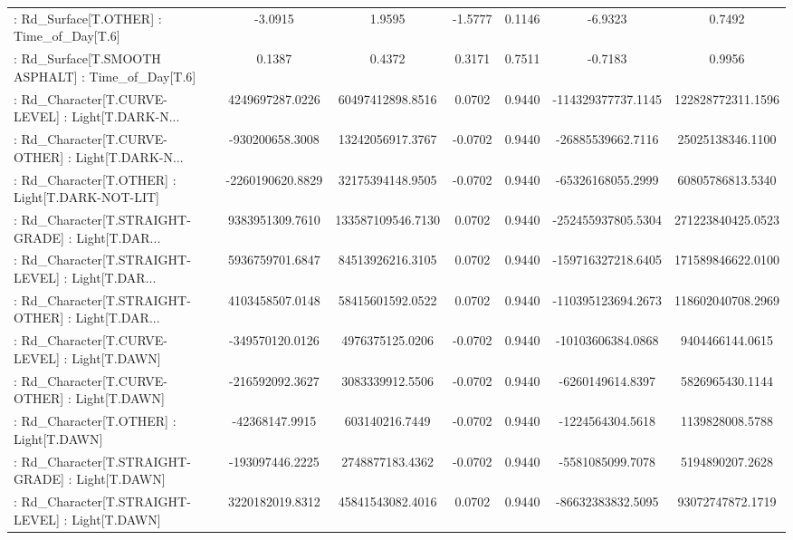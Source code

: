 \begin{longtable}{p{4cm}cccccc}
 : Rd\_Surface[T.OTHER] : Time\_of\_Day[T.6]          &           -3.0915 &            1.9595 & -1.5777 &       0.1146 &            -6.9323 &            0.7492 \\
 : Rd\_Surface[T.SMOOTH ASPHALT] : Time\_of\_Day[T.6] &            0.1387 &            0.4372 &  0.3171 &       0.7511 &            -0.7183 &            0.9956 \\
 : Rd\_Character[T.CURVE-LEVEL] : Light[T.DARK-N... &   4249697287.0226 &  60497412898.8516 &  0.0702 &       0.9440 & -114329377737.1145 & 122828772311.1596 \\
 : Rd\_Character[T.CURVE-OTHER] : Light[T.DARK-N... &   -930200658.3008 &  13242056917.3767 & -0.0702 &       0.9440 &  -26885539662.7116 &  25025138346.1100 \\
 : Rd\_Character[T.OTHER] : Light[T.DARK-NOT-LIT]   &  -2260190620.8829 &  32175394148.9505 & -0.0702 &       0.9440 &  -65326168055.2999 &  60805786813.5340 \\
 : Rd\_Character[T.STRAIGHT-GRADE] : Light[T.DAR... &   9383951309.7610 & 133587109546.7130 &  0.0702 &       0.9440 & -252455937805.5304 & 271223840425.0523 \\
 : Rd\_Character[T.STRAIGHT-LEVEL] : Light[T.DAR... &   5936759701.6847 &  84513926216.3105 &  0.0702 &       0.9440 & -159716327218.6405 & 171589846622.0100 \\
 : Rd\_Character[T.STRAIGHT-OTHER] : Light[T.DAR... &   4103458507.0148 &  58415601592.0522 &  0.0702 &       0.9440 & -110395123694.2673 & 118602040708.2969 \\
 : Rd\_Character[T.CURVE-LEVEL] : Light[T.DAWN]     &   -349570120.0126 &   4976375125.0206 & -0.0702 &       0.9440 &  -10103606384.0868 &   9404466144.0615 \\
 : Rd\_Character[T.CURVE-OTHER] : Light[T.DAWN]     &   -216592092.3627 &   3083339912.5506 & -0.0702 &       0.9440 &   -6260149614.8397 &   5826965430.1144 \\
 : Rd\_Character[T.OTHER] : Light[T.DAWN]           &    -42368147.9915 &    603140216.7449 & -0.0702 &       0.9440 &   -1224564304.5618 &   1139828008.5788 \\
 : Rd\_Character[T.STRAIGHT-GRADE] : Light[T.DAWN]  &   -193097446.2225 &   2748877183.4362 & -0.0702 &       0.9440 &   -5581085099.7078 &   5194890207.2628 \\
 : Rd\_Character[T.STRAIGHT-LEVEL] : Light[T.DAWN]  &   3220182019.8312 &  45841543082.4016 &  0.0702 &       0.9440 &  -86632383832.5095 &  93072747872.1719 \\

\end{longtable}
